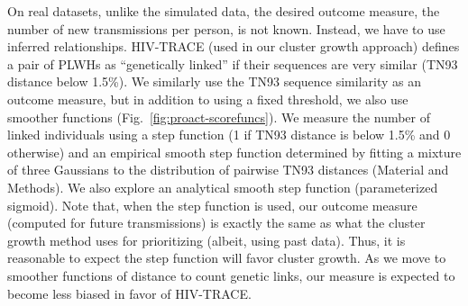 On real datasets, unlike the simulated data, the desired outcome measure, the number of new transmissions per person, is not known. Instead, we have to use inferred relationships. HIV-TRACE (used in our cluster growth approach) defines a pair of \glspl{PLWH} as ``genetically linked'' if their sequences are very similar (\gls{TN93} distance below 1.5\%). We similarly use the \gls{TN93} sequence similarity as an outcome measure, but in addition to using a fixed threshold, we also use smoother functions (Fig.~\ref{fig:proact-scorefuncs}). We measure the number of linked individuals using a step function (1 if \gls{TN93} distance is below 1.5\% and 0 otherwise) and an empirical smooth step function determined by fitting a mixture of three Gaussians to the distribution of pairwise \gls{TN93} distances (Material and Methods). We also explore an analytical smooth step function (parameterized sigmoid). Note that, when the step function is used, our outcome measure (computed for future transmissions) is exactly the same as what the cluster growth method uses for prioritizing (albeit, using past data). Thus, it is reasonable to expect the step function will favor cluster growth. As we move to smoother functions of distance to count genetic links, our measure is expected to become less biased in favor of HIV-TRACE.

